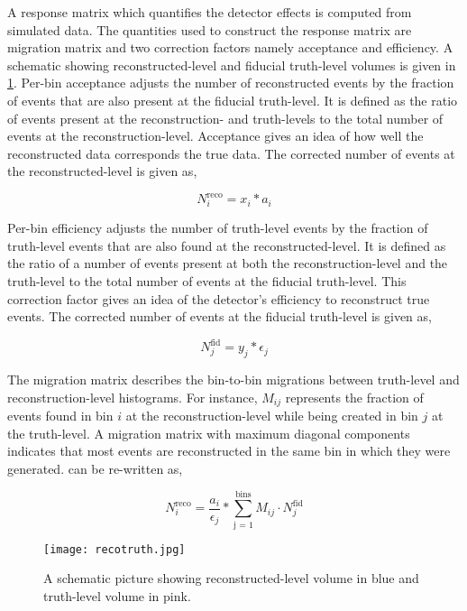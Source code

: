 A response matrix which quantifies the detector effects is computed from simulated data. 
The quantities used to construct the response matrix are migration matrix and two correction 
factors namely acceptance and efficiency. A schematic showing reconstructed-level
and fiducial truth-level volumes is given in \cref{fig:recotruth}.
Per-bin acceptance adjusts the number of reconstructed
events by the fraction of events that are also present at the fiducial truth-level. It is defined 
as the ratio of events present at the reconstruction- and truth-levels to the total number of 
events at the reconstruction-level. Acceptance gives an idea of how well the reconstructed data
corresponds the true data. The corrected number of events at the reconstructed-level is
given as,

\begin{equation}
    N_{i}^{\text{reco}} = x_i * a_i
\end{equation}

Per-bin efficiency adjusts the number of truth-level events by the fraction of truth-level events
that are also found at the reconstructed-level. It is defined as the ratio of a number of events
present at both the reconstruction-level and the truth-level to the total number of events at the 
fiducial truth-level. This correction factor gives an idea of the detector's efficiency to 
reconstruct true events. The corrected number of events at the fiducial truth-level is
given as,

\begin{equation}
    N_{j}^{\text{fid}} = y_j * \epsilon_j
\end{equation}

The migration matrix describes the bin-to-bin migrations between truth-level and 
reconstruction-level histograms. For instance, $M_{ij}$ represents the fraction of events 
found in bin $i$ at the reconstruction-level while being created in bin $j$ at the truth-level.
A migration matrix with maximum diagonal components indicates that most events are 
reconstructed in the same bin in which they were generated.  can be re-written as,

\begin{equation}
    N_{i}^{\text{reco}} = \frac{a_i}{\epsilon_j} * \sum_{\text{j = 1}}^{\text{bins}} M_{ij} \cdot N_{j}^{\text{fid}} 
\end{equation}


\begin{figure}
    \centering
        \texttt{[image: recotruth.jpg]}
        \caption{A schematic picture showing reconstructed-level volume in blue and 
        truth-level volume in pink.}
           \label{fig:recotruth}
  \end{figure}

